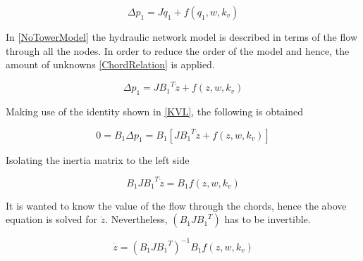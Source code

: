 \begin{equation}
  \Delta p_1 = J \dot{q}_1 + f(q_1, w, k_v)
  \label{NoTowerModel}
\end{equation}

In \eqref{NoTowerModel} the hydraulic network model is described in terms of the 
flow through all the nodes. In order to reduce the order of the model and hence, 
the amount of unknowns \eqref{ChordRelation} is applied. 

\begin{equation}
  \Delta p_1 = J {B_1}^T \dot{z} + f(z, w, k_v)
  \label{ChordsModel}
\end{equation}

Making use of the identity shown in \eqref{KVL}, the following is obtained

\begin{equation}
  0 = B_1 \Delta p_1 = B_1 [J {B_1}^T \dot{z} + f(z, w, k_v)] 
 \end{equation}

Isolating the inertia matrix to the left side

\begin{equation}
  B_1 J {B_1}^T \dot{z}  = B_1 f(z, w, k_v)
 \end{equation}

It is wanted to know the value of the flow through the chords, hence the above equation is solved 
for $\dot{z}$. Nevertheless, $(B_1 J {B_1}^T)$ has to be invertible.


\begin{equation}
   \dot{z}  = (B_1 J {B_1}^T)^{-1}B_1 f(z, w, k_v)
   \label{ParatModelFinal}
 \end{equation}


